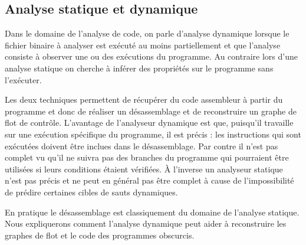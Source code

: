 \subsection{Analyse statique et dynamique}
Dans le domaine de l'analyse de code, on parle d'analyse dynamique lorsque le fichier binaire à analyser est exécuté au moins partiellement et que l'analyse consiste à observer une ou des exécutions du programme. Au contraire lors d'une analyse statique on cherche à inférer des propriétés sur le programme sans l'exécuter.

Les deux techniques permettent de récupérer du code assembleur à partir du programme et donc de réaliser un désassemblage et de reconstruire un graphe de flot de contrôle.
L'avantage de l'analyseur dynamique est que, puisqu'il travaille sur une exécution spécifique du programme, il est précis : les instructions qui sont exécutées doivent être inclues dans le désassemblage.
Par contre il n'est pas complet vu qu'il ne suivra pas des branches du programme qui pourraient être utilisées si leurs conditions étaient vérifiées. À l'inverse un analyseur statique n'est pas précis et ne peut en général pas être complet à cause de l'impossibilité de prédire certaines cibles de sauts dynamiques.

En pratique le désassemblage est classiquement du domaine de l'analyse statique. Nous expliquerons comment l'analyse dynamique peut aider à reconstruire les graphes de flot et le code des programmes obscurcis.

